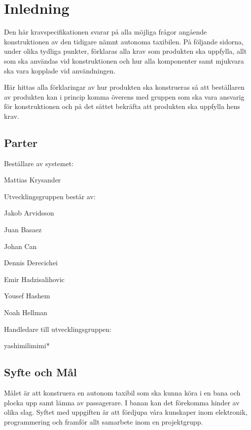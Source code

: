 \documentclass[kravspec/krav.tex]{subfiles}
\begin{document}
\section{Inledning}
Den här kravspecifikationen svarar på alla möjliga frågor angående konstruktionen av den tidigare nämnt autonoma taxibilen. På följande sidorna, under olika tydliga punkter, förklaras alla krav som produkten ska uppfylla, allt som ska användas vid konstruktionen och hur alla komponenter samt mjukvara ska vara kopplade vid användningen.

Här hittas alla förklaringar av hur produkten ska konstrueras så att beställaren av produkten kan i princip komma överens med gruppen som ska vara ansvarig för konstruktionen och på det sättet bekräfta att produkten ska uppfylla hens krav.


\subsection{Parter}


Beställare av systemet:
\begin{list}{}
       \item Mattias Krysander  \newline    
\end{list}

\noindent
Utvecklingsgruppen består av:

\begin{list}{}
       \item Jakob Arvidsson
       \item Juan Basaez
       \item Johan Can
       \item Dennis Derecichei
       \item Emir Hadzisalihovic 
       \item Yousef Hashem
       \item Noah Hellman \newline
\end{list}

\noindent
Handledare till utvecklingsgruppen:

\begin{list}{}	
	\item *yashimilimimi* \newline
\end{list}

\subsection{Syfte och Mål}
Målet är att konstruera en autonom taxibil som ska kunna köra i en bana och
plocka upp samt lämna av passagerare. I banan kan det förekomma hinder av olika
slag. Syftet med uppgiften är att fördjupa våra kunskaper inom elektronik,
programmering och framför allt samarbete inom en projektgrupp.
\end{document}
